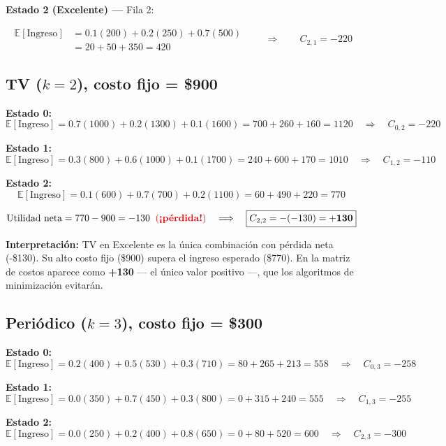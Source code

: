 \documentclass[12pt,a4paper]{article}
\begin{document}
\vspace{0.3cm}
\textbf{Estado 2 (Excelente) ---} Fila 2:

\[
\begin{aligned}
\mathbb{E}[\text{Ingreso}] &= 0.1(200) + 0.2(250) + 0.7(500) \\
&= 20 + 50 + 350 = 420
\end{aligned}
\qquad\Longrightarrow\qquad
\boxed{C_{2,1} = -220}
\]

\subsection*{TV ($k = 2$), costo fijo = \$900}

\textbf{Estado 0:}
\[
\mathbb{E}[\text{Ingreso}] = 0.7(1000) + 0.2(1300) + 0.1(1600) = 700+260+160 = 1120
\quad\Longrightarrow\quad
\boxed{C_{0,2} = -220}
\]

\textbf{Estado 1:}
\[
\mathbb{E}[\text{Ingreso}] = 0.3(800) + 0.6(1000) + 0.1(1700) = 240+600+170 = 1010
\quad\Longrightarrow\quad
\boxed{C_{1,2} = -110}
\]

\textbf{Estado 2:}
\[
\mathbb{E}[\text{Ingreso}] = 0.1(600) + 0.7(700) + 0.2(1100) = 60+490+220 = 770
\]

\[
\text{Utilidad neta} = 770 - 900 = -130 \;\; \text{\color{red}(\textbf{¡pérdida!})}
\quad\Longrightarrow\quad
\boxed{C_{2,2} = -(-130) = \mathbf{+130}}
\]

\textbf{Interpretación:} TV en Excelente es la única combinación con pérdida neta (-\$130). Su alto costo fijo (\$900) supera el ingreso esperado (\$770). En la matriz de costos aparece como \textbf{+130} --- el único valor positivo ---, que los algoritmos de minimización evitarán.

\subsection*{Periódico ($k = 3$), costo fijo = \$300}

\textbf{Estado 0:}
\[
\mathbb{E}[\text{Ingreso}] = 0.2(400) + 0.5(530) + 0.3(710) = 80+265+213 = 558
\quad\Longrightarrow\quad
\boxed{C_{0,3} = -258}
\]

\textbf{Estado 1:}
\[
\mathbb{E}[\text{Ingreso}] = 0.0(350) + 0.7(450) + 0.3(800) = 0+315+240 = 555
\quad\Longrightarrow\quad
\boxed{C_{1,3} = -255}
\]

\textbf{Estado 2:}
\[
\mathbb{E}[\text{Ingreso}] = 0.0(250) + 0.2(400) + 0.8(650) = 0+80+520 = 600
\quad\Longrightarrow\quad
\boxed{C_{2,3} = -300}
\]
\end{document}
